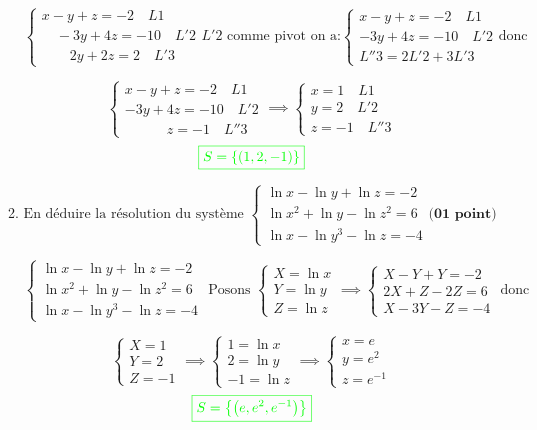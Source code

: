 \documentclass[12pt]{article}
\begin{document}
\begin{enumerate}
\begin{enumerate}
\[
\begin{cases}
x-y+z = -2\quad L1\\
\quad -3y+4z = -10\quad L'2\\
\quad\quad 2y+2z =2\quad L'3
\end{cases} L'2 \text{ comme pivot on a:}
\begin{cases}
x-y+z = -2\quad L1\\
-3y+4z = -10\quad L'2\\
L''3=2L'2+3L'3
\end{cases}\text{donc}
\]

\[
\begin{cases}
x-y+z = -2\quad L1\\
-3y+4z = -10\quad L'2\\
\quad\quad\quad z=-1\quad L''3
\end{cases}\implies
\begin{cases}
x= 1\quad L1\\
y = 2\quad L'2\\
z=-1\quad L''3
\end{cases}
\]
\[\textcolor{green}{\boxed{S=\left\lbrace \left(1, 2, -1  \right) \right\rbrace }}\]
\item \[ \text{En déduire la résolution du système }
\begin{cases}
\ln x-\ln y+\ln z = -2\\
\ln x^{2}+\ln y-\ln z^{2} = 6\\
\ln x-\ln y^{3}-\ln z=-4
\end{cases}  \textbf{(01 point)}\]

\[
\begin{cases}
\ln x-\ln y+\ln z = -2\\
\ln x^{2}+\ln y-\ln z^{2} = 6\\
\ln x-\ln y^{3}-\ln z=-4
\end{cases} \text{ Posons }
\begin{cases}
X =\ln x\\
Y =\ln y\\
Z =\ln z
\end{cases}\implies
\begin{cases}
X-Y+Y = -2\\
2X+Z-2Z = 6\\
X-3Y-Z=-4
\end{cases}\text{ donc }
\]

\[
\begin{cases}
X= 1\\
Y= 2\\
Z=-1
\end{cases}\implies
\begin{cases}
1 =\ln x\\
2 =\ln y\\
-1 =\ln z 
\end{cases}\implies
\begin{cases}
x=e\\
y=e^{2}\\
z=e^{-1}
\end{cases}
\]
\[\textcolor{green}{\boxed{S=\left\lbrace \left(e, e^{2}, e^{-1}\right) \right\rbrace }}\]
\end{enumerate}
\end{enumerate}
\end{document}
